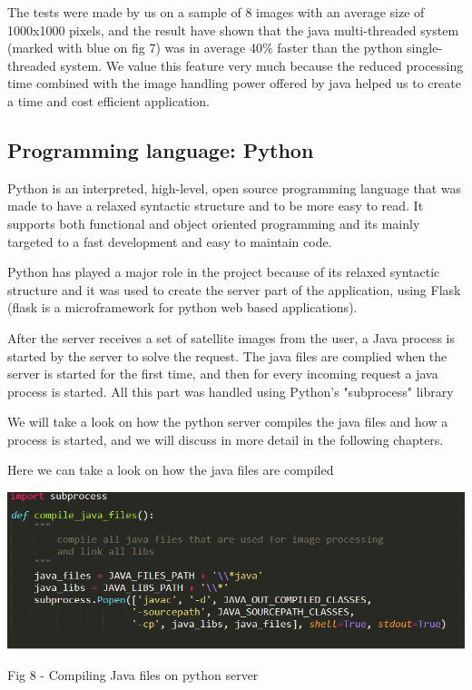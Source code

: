\documentclass[12pt, a4paper]{report}
\begin{document}
\quad
The tests were made by us on a sample of 8 images with an average size of 1000x1000 pixels, and the result have shown that the java multi-threaded system (marked with blue on fig 7) was in average 40\% faster than the python single-threaded system. We value this feature very much because the reduced processing time combined with the image handling power offered by java helped us to create a time and cost efficient application.


\subsection{Programming language: Python}
\medskip

\quad
Python is an interpreted, high-level, open source programming language that was made to have a relaxed syntactic structure and to be more easy to read. It supports both functional and object oriented programming and its mainly targeted to a fast development and easy to maintain code.
\par

Python has played a major role in the project because of its relaxed syntactic structure and it was used to create the server part of the application, using Flask (flask is a microframework for python web based applications).
\par 

After the server receives a set of satellite images from the user, a Java process is started by the server to solve the request. The java files are complied when the server is started for the first time, and then for every incoming request a java process is started. All this part was handled using Python's "subprocess" library
\par
\medskip

We will take a look on how the python server compiles the java files and how a process is started, and we will discuss in more detail in the following chapters.
\medskip

Here we can take a look on how the java files are compiled
\par
\bigskip
\includegraphics[scale=0.8, center]{python_call_java_1.png}
\begin{center}
Fig 8 - Compiling Java files on python server
\end{center}
\end{document}
